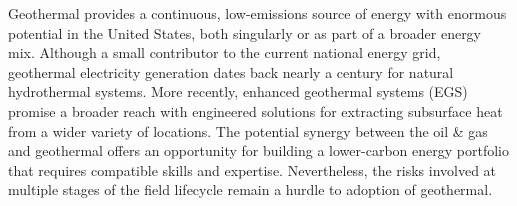Geothermal provides a continuous, low-emissions source of energy with enormous potential in the United States, both singularly or as part of a broader energy mix. Although a small contributor to the current national energy grid, geothermal electricity generation dates back nearly a century for natural hydrothermal systems. More recently, enhanced geothermal systems (EGS) promise a broader reach with engineered solutions for extracting subsurface heat from a wider variety of locations. The potential synergy between the oil \& gas and geothermal offers an opportunity for building a lower-carbon energy portfolio that requires compatible skills and expertise. Nevertheless, the risks involved at multiple stages of the field lifecycle remain a hurdle to adoption of geothermal.

